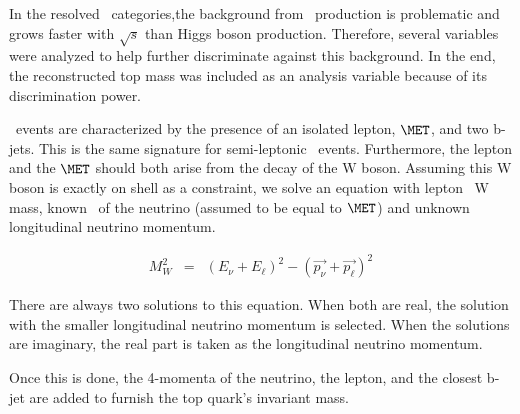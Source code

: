 In the resolved \WlnHbb\ categories,the background from \ttbar\ production is problematic
and grows faster with $\sqrt{s}$ than Higgs boson production.
Therefore, several variables were analyzed to help further discriminate against 
this background. In the end, the reconstructed top mass was included as an 
analysis variable because of its discrimination power.

\WlnHbb\ events are characterized by the presence of an isolated lepton, 
$\MET$, and two b-jets.  This is the same signature for semi-leptonic \ttbar\ 
events.  Furthermore, the lepton and the $\MET$ should both arise from the 
decay of the W boson.  Assuming this W boson is exactly on shell as a constraint,
we solve an equation with lepton \pt\, W mass, known \pt\ of the neutrino 
(assumed to be equal to $\MET$) and unknown longitudinal neutrino momentum.

\begin{eqnarray}
M_{W}^2 & = & (E_{\nu}+E_{\ell})^2-(\overrightarrow{p_{\nu}}+\overrightarrow{p_{\ell}})^2
\end{eqnarray}

There are always two solutions to this equation.  When both are real, the 
solution with the smaller longitudinal neutrino momentum is selected.  When 
the solutions are imaginary, the real part is taken as the longitudinal 
neutrino momentum.

Once this is done, the 4-momenta of the neutrino, the lepton,
and the closest b-jet are added to furnish the top quark's invariant mass.
